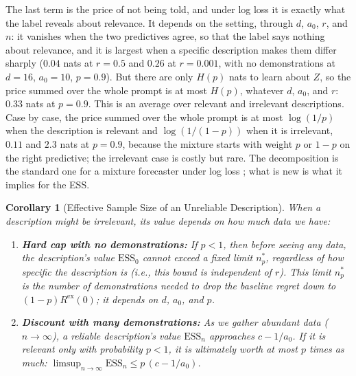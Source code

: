 \documentclass{article}
\newtheorem{corollary}[theorem]{Corollary}
\newcommand{\ess}{\mathrm{ESS}}
\begin{document}
The last term is the price of not being told, and under log loss it is exactly what the label reveals about relevance. It depends on the setting, through $d$, $a_0$, $r$, and $n$: it vanishes when the two predictives agree, so that the label says nothing about relevance, and it is largest when a specific description makes them differ sharply ($0.04$ nats at $r = 0.5$ and $0.26$ at $r = 0.001$, with no demonstrations at $d = 16$, $a_0 = 10$, $p = 0.9$). But there are only $H(p)$ nats to learn about $Z$, so the price summed over the whole prompt is at most $H(p)$, whatever $d$, $a_0$, and $r$: $0.33$ nats at $p = 0.9$. This is an average over relevant and irrelevant descriptions. Case by case, the price summed over the whole prompt is at most $\log(1/p)$ when the description is relevant and $\log(1/(1-p))$ when it is irrelevant, $0.11$ and $2.3$ nats at $p = 0.9$, because the mixture starts with weight $p$ or $1-p$ on the right predictive; the irrelevant case is costly but rare. The decomposition is the standard one for a mixture forecaster under log loss \citep{cesabianchi2006, merhav1998}; what is new is what it implies for the ESS.

\begin{corollary}[Effective Sample Size of an Unreliable Description]\label{cor:ess}
When a description might be irrelevant, its value depends on how much data we have:
\begin{enumerate}
    \item[(i)] \textbf{Hard cap with no demonstrations:} If $p < 1$, then before seeing any data, the description's value $\ess_0$ cannot exceed a fixed limit $n^*_p$, regardless of how specific the description is (i.e., this bound is independent of $r$). This limit $n^*_p$ is the number of demonstrations needed to drop the baseline regret down to $(1-p)R^{\mathrm{ex}}(0)$; it depends on $d$, $a_0$, and $p$.
    \item[(ii)] \textbf{Discount with many demonstrations:} As we gather abundant data ($n \to \infty$), a reliable description's value $\ess_n$ approaches $c - 1/a_0$. If it is relevant only with probability $p < 1$, it is ultimately worth at most $p$ times as much: $\limsup_{n \to \infty} \ess_n \le p\,(c - 1/a_0)$.
\end{enumerate}
\end{corollary}
\end{document}
